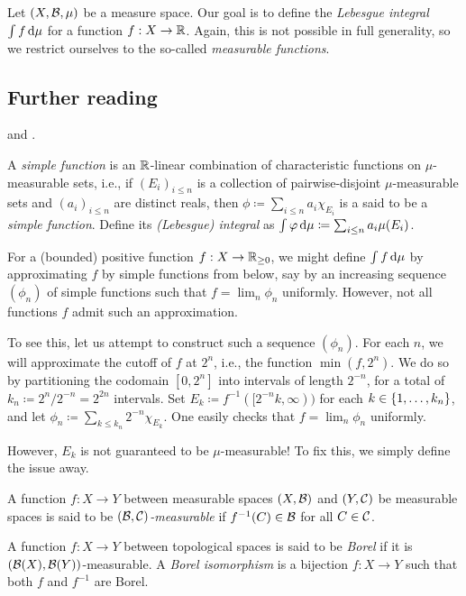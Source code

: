 \documentclass[reqno, twoside]{article}
\begin{document}
    Let $(X,\mathcal{B},\mu)$ be a measure space. Our goal is to define the \textit{Lebesgue integral} $\int f\,\mathrm{d}\mu$ for a function $f:X\to\mathbb{R}$. Again, this is not possible in full generality, so we restrict ourselves to the so-called \textit{measurable functions}.

    {\vspace{-0.1in}\small\subsection*{Further reading}\cite[Lectures 9 to 13, 17 to 21]{Tse23} and \cite[Chapters 2 and 3]{Fol99}.}

    \begin{definition}
        A \textit{simple function} is an $\mathbb{R}$-linear combination of characteristic functions on $\mu$-measurable sets, i.e., if $(E_i)_{i\leq n}$ is a collection of pairwise-disjoint $\mu$-measurable sets and $(a_i)_{i\leq n}$ are distinct reals, then $\phi\coloneqq\sum_{i\leq n}a_i\chi_{E_i}$ is a said to be a \textit{simple function}. Define its \textit{(Lebesgue) integral} as $\int\varphi\,\mathrm{d}\mu\coloneqq\sum_{i\leq n}a_i\mu(E_i)$.
    \end{definition}

    For a (bounded) positive function $f:X\to\mathbb{R}_{\geq0}$, we might define $\int f\,\mathrm{d}\mu$ by approximating $f$ by simple functions from below, say by an increasing sequence $(\phi_n)$ of simple functions such that $f=\lim_n\phi_n$ uniformly. However, not all functions $f$ admit such an approximation.

    To see this, let us attempt to construct such a sequence $(\phi_n)$. For each $n$, we will approximate the cutoff of $f$ at $2^n$, i.e., the function $\min(f,2^n)$. We do so by partitioning the codomain $[0,2^n]$ into intervals of length $2^{-n}$, for a total of $k_n\coloneqq2^n/2^{-n}=2^{2n}$ intervals. Set $E_k\coloneqq f^{-1}([2^{-n}k,\infty))$ for each $k\in\left\{1,\dots,k_n\right\}$, and let $\phi_n\coloneqq\sum_{k\leq k_n}2^{-n}\chi_{E_k}$. One easily checks that $f=\lim_n\phi_n$ uniformly.

    However, $E_k$ is not guaranteed to be $\mu$-measurable! To fix this, we simply define the issue away.

    \begin{definition}
        A function $f:X\to Y$ between measurable spaces $(X,\mathcal{B})$ and $(Y,\mathcal{C})$ be measurable spaces is said to be \textit{$(\mathcal{B},\mathcal{C})$-measurable} if $f^{-1}(C)\in\mathcal{B}$ for all $C\in\mathcal{C}$.

        A function $f:X\to Y$ between topological spaces is said to be \textit{Borel} if it is $(\mathcal{B}(X),\mathcal{B}(Y))$-measurable. A \textit{Borel isomorphism} is a bijection $f:X\to Y$ such that both $f$ and $f^{-1}$ are Borel.
    \end{definition}
\end{document}
